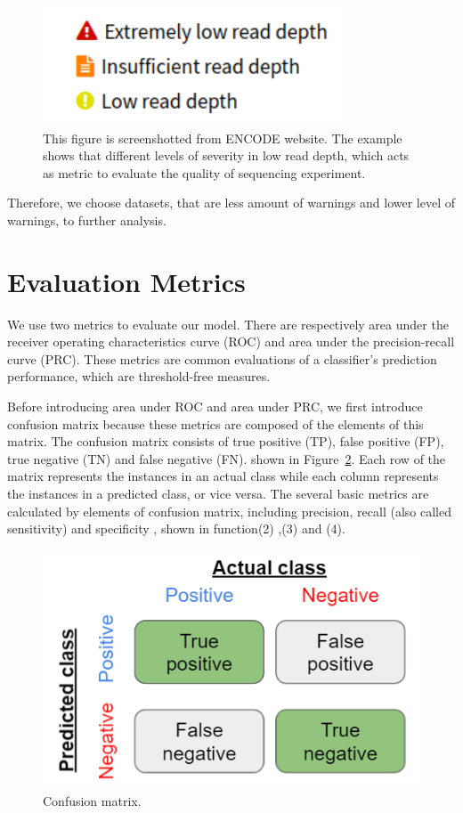 \begin{figure}[H]
    \centering
    \includegraphics[width=0.5\columnwidth]{body/figure/figure13.png}
    \captionsetup{labelfont=bf}
    \renewcommand{\baselinestretch}{1.0}
    \caption[Example of warning levels]{This figure is screenshotted from ENCODE website. The example shows that different levels of severity in low read depth, which acts as metric to evaluate the quality of sequencing experiment.}
    \label{f13}
\end{figure}

Therefore, we choose datasets, that are less amount of warnings and lower level of warnings, to further analysis.

\section{Evaluation Metrics} \label{metric}
We use two metrics to evaluate our model. There are respectively area under the receiver operating characteristics curve (ROC) and area under the precision-recall curve (PRC). These metrics are common evaluations of a classifier’s prediction performance, which are threshold-free measures.

Before introducing area under ROC and area under PRC, we first introduce confusion matrix because these metrics are composed of the elements of this matrix. The confusion matrix consists of true positive (TP), false positive (FP), true negative (TN) and false negative (FN). shown in Figure~\ref{f14}. Each row of the matrix represents the instances in an actual class while each column represents the instances in a predicted class, or vice versa. The several basic metrics are calculated by elements of confusion matrix, including precision, recall (also called sensitivity) and specificity \cite{saito2015precision}, shown in function(2) ,(3) and (4).

\begin{figure}[H]
    \centering
    \includegraphics[width=0.65\columnwidth]{body/figure/figure14.png}
    \captionsetup{labelfont=bf}
    \caption[Confusion matrix]{Confusion matrix.}
    \label{f14}
\end{figure}

